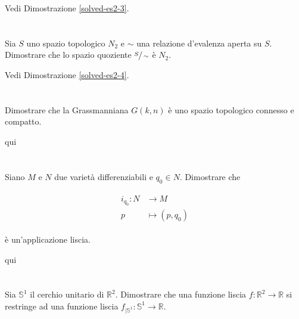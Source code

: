 Vedi Dimostrazione \ref{solved-es2-3}.

\tocless\section{}\label{es2-4}

\begin{tcolorbox}
	Sia $ S $ uno spazio topologico $ N_{2} $ e $ \sim $ una relazione d'evalenza aperta su $ S $. Dimostrare che lo spazio quoziente $ \sfrac{S}{\sim} $ è $ N_{2} $.
\end{tcolorbox}

Vedi Dimostrazione \ref{solved-es2-4}.

\tocless\section{}\label{es2-5}

\begin{tcolorbox}
	Dimostrare che la Grassmanniana $ G(k,n) $ è uno spazio topologico connesso e compatto.
\end{tcolorbox}

qui

\tocless\section{}\label{es2-6}

\begin{tcolorbox}
	Siano $ M $ e $ N $ due varietà differenziabili e $ q_{0} \in N $. Dimostrare che
	
	\begin{align}
		\begin{split}
			i_{q_{0}} : N &\to M\\
			p &\mapsto (p,q_{0})
		\end{split}
	\end{align}
	
	è un'applicazione liscia.
\end{tcolorbox}

qui

\tocless\section{}\label{es2-7}

\begin{tcolorbox}
	Sia $ \mathbb{S}^{1} $ il cerchio unitario di $ \mathbb{R}^{2} $. Dimostrare che una funzione liscia $ f : \mathbb{R}^{2} \to \mathbb{R} $ si restringe ad una funzione liscia $ f_{|\mathbb{S}^{1}} : \mathbb{S}^{1} \to \mathbb{R} $.
\end{tcolorbox}

